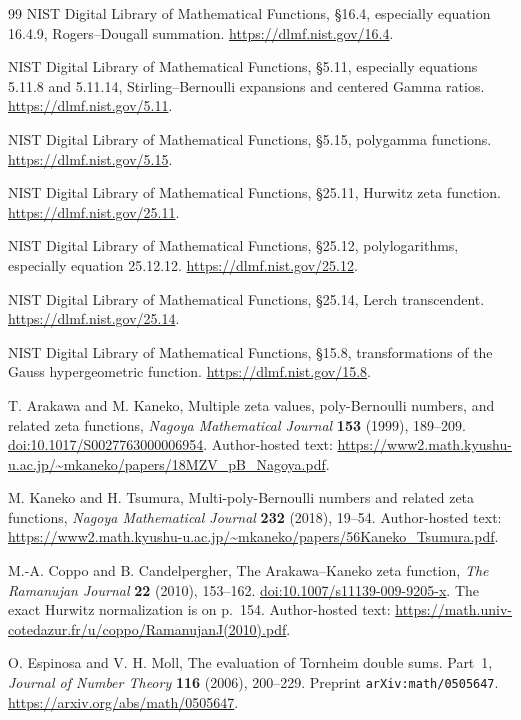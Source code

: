\documentclass[11pt,a4paper]{article}
\numberwithin{equation}{section}
\theoremstyle{definition}
\theoremstyle{remark}
\newcommand{\src}[1]{\nolinkurl{#1}}
\begin{document}
\begin{thebibliography}{99}
NIST Digital Library of Mathematical Functions,
\S16.4, especially equation 16.4.9, Rogers--Dougall summation.
\url{https://dlmf.nist.gov/16.4}.

NIST Digital Library of Mathematical Functions,
\S5.11, especially equations 5.11.8 and 5.11.14,
Stirling--Bernoulli expansions and centered Gamma ratios.
\url{https://dlmf.nist.gov/5.11}.

NIST Digital Library of Mathematical Functions,
\S5.15, polygamma functions.
\url{https://dlmf.nist.gov/5.15}.

NIST Digital Library of Mathematical Functions,
\S25.11, Hurwitz zeta function.
\url{https://dlmf.nist.gov/25.11}.

NIST Digital Library of Mathematical Functions,
\S25.12, polylogarithms, especially equation 25.12.12.
\url{https://dlmf.nist.gov/25.12}.

NIST Digital Library of Mathematical Functions,
\S25.14, Lerch transcendent.
\url{https://dlmf.nist.gov/25.14}.

NIST Digital Library of Mathematical Functions,
\S15.8, transformations of the Gauss hypergeometric function.
\url{https://dlmf.nist.gov/15.8}.

T. Arakawa and M. Kaneko,
Multiple zeta values, poly-Bernoulli numbers, and related zeta functions,
\emph{Nagoya Mathematical Journal} \textbf{153} (1999), 189--209.
\href{https://doi.org/10.1017/S0027763000006954}{doi:10.1017/S0027763000006954}.
Author-hosted text:
\url{https://www2.math.kyushu-u.ac.jp/~mkaneko/papers/18MZV_pB_Nagoya.pdf}.

M. Kaneko and H. Tsumura,
Multi-poly-Bernoulli numbers and related zeta functions,
\emph{Nagoya Mathematical Journal} \textbf{232} (2018), 19--54.
Author-hosted text:
\url{https://www2.math.kyushu-u.ac.jp/~mkaneko/papers/56Kaneko_Tsumura.pdf}.

M.-A. Coppo and B. Candelpergher,
The Arakawa--Kaneko zeta function,
\emph{The Ramanujan Journal} \textbf{22} (2010), 153--162.
\href{https://doi.org/10.1007/s11139-009-9205-x}{doi:10.1007/s11139-009-9205-x}.
The exact Hurwitz normalization is on p.~154.
Author-hosted text:
\url{https://math.univ-cotedazur.fr/u/coppo/RamanujanJ(2010).pdf}.

O. Espinosa and V. H. Moll,
The evaluation of Tornheim double sums. Part~1,
\emph{Journal of Number Theory} \textbf{116} (2006), 200--229.
Preprint \src{arXiv:math/0505647}.
\url{https://arxiv.org/abs/math/0505647}.

\end{thebibliography}

\end{document}
